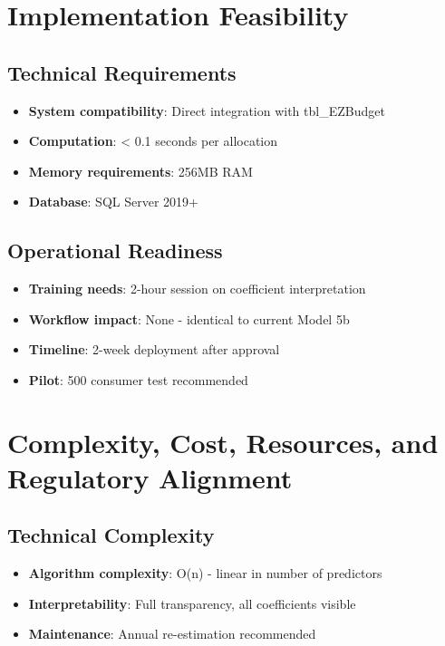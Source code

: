 \section{Implementation Feasibility}

\subsection{Technical Requirements}

\begin{itemize}
    \item \textbf{System compatibility}: Direct integration with tbl\_EZBudget
    \item \textbf{Computation}: < 0.1 seconds per allocation
    \item \textbf{Memory requirements}: 256MB RAM
    \item \textbf{Database}: SQL Server 2019+
\end{itemize}

\subsection{Operational Readiness}

\begin{itemize}
    \item \textbf{Training needs}: 2-hour session on coefficient interpretation
    \item \textbf{Workflow impact}: None - identical to current Model 5b
    \item \textbf{Timeline}: 2-week deployment after approval
    \item \textbf{Pilot}: 500 consumer test recommended
\end{itemize}

\section{Complexity, Cost, Resources, and Regulatory Alignment}

\subsection{Technical Complexity}

\begin{itemize}
    \item \textbf{Algorithm complexity}: O(n) - linear in number of predictors
    \item \textbf{Interpretability}: Full transparency, all coefficients visible
    \item \textbf{Maintenance}: Annual re-estimation recommended
\end{itemize}

